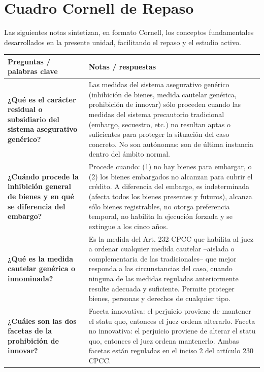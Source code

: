 \documentclass[12pt,oneside]{book}
\begin{document}
\chapter{Cuadro Cornell de Repaso}

Las siguientes notas sintetizan, en formato Cornell, los conceptos fundamentales desarrollados en la presente unidad, facilitando el repaso y el estudio activo.

\begin{longtable}{
    >{\raggedright\arraybackslash}p{}
    >{\raggedright\arraybackslash}p{}
}
\toprule
\textbf{Preguntas / palabras clave} &
\textbf{Notas / respuestas} \\
\midrule
\endhead

\textbf{¿Qué es el carácter residual o subsidiario del sistema asegurativo genérico?} &
Las medidas del sistema asegurativo genérico (inhibición de bienes, medida cautelar genérica, prohibición de innovar) sólo proceden cuando las medidas del sistema precautorio tradicional (embargo, secuestro, etc.) no resultan aptas o suficientes para proteger la situación del caso concreto. No son autónomas: son de última instancia dentro del ámbito normal. \\

\textbf{¿Cuándo procede la inhibición general de bienes y en qué se diferencia del embargo?} &
Procede cuando: (1) no hay bienes para embargar, o (2) los bienes embargados no alcanzan para cubrir el crédito. A diferencia del embargo, es indeterminada (afecta todos los bienes presentes y futuros), alcanza sólo bienes registrables, no otorga preferencia temporal, no habilita la ejecución forzada y se extingue a los cinco años. \\

\textbf{¿Qué es la medida cautelar genérica o innominada?} &
Es la medida del Art. 232 CPCC que habilita al juez a ordenar cualquier medida cautelar --aislada o complementaria de las tradicionales-- que mejor responda a las circunstancias del caso, cuando ninguna de las medidas reguladas anteriormente resulte adecuada y suficiente. Permite proteger bienes, personas y derechos de cualquier tipo. \\

\textbf{¿Cuáles son las dos facetas de la prohibición de innovar?} &
Faceta innovativa: el perjuicio proviene de mantener el statu quo, entonces el juez ordena alterarlo. Faceta no innovativa: el perjuicio proviene de alterar el statu quo, entonces el juez ordena mantenerlo. Ambas facetas están reguladas en el inciso 2 del artículo 230 CPCC. \\


\end{longtable}
\end{document}
